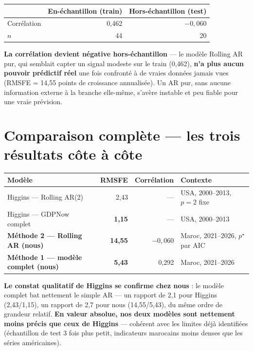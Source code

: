 \documentclass[11pt,a4paper]{article}
\begin{document}
\begin{resultatbox}
\begin{center}
\begin{tabular}{lrr}
\toprule
& \textbf{En-échantillon (train)} & \textbf{Hors-échantillon (test)} \\
\midrule
Corrélation & 0,462 & $-0{,}060$ \\
$n$ & 44 & 20 \\
\bottomrule
\end{tabular}
\end{center}
\end{resultatbox}

\begin{alertebox}
\textbf{La corrélation devient négative hors-échantillon} --- le modèle Rolling AR pur, qui semblait capter un signal modeste sur le train (0,462), \textbf{n'a plus aucun pouvoir prédictif réel} une fois confronté à de vraies données jamais vues (RMSFE = 14,55 points de croissance annualisée). Un AR pur, sans aucune information externe à la branche elle-même, s'avère instable et peu fiable pour une vraie prévision.
\end{alertebox}

\section{Comparaison complète --- les trois résultats côte à côte}

\begin{center}
\small
\begin{tabular}{lrrl}
\toprule
\textbf{Modèle} & \textbf{RMSFE} & \textbf{Corrélation} & \textbf{Contexte} \\
\midrule
Higgins --- Rolling AR(2) & 2,43 & --- & USA, 2000--2013, $p=2$ fixe \\
Higgins --- GDPNow complet & \textbf{1,15} & --- & USA, 2000--2013 \\
\midrule
\textbf{Méthode 2 --- Rolling AR (nous)} & \textbf{14,55} & $-0{,}060$ & Maroc, 2021--2026, $p^\star$ par AIC \\
\textbf{Méthode 1 --- modèle complet (nous)} & \textbf{5,43} & 0,292 & Maroc, 2021--2026 \\
\bottomrule
\end{tabular}
\end{center}

\begin{resultatbox}
\textbf{Le constat qualitatif de Higgins se confirme chez nous} : le modèle complet bat nettement le simple AR --- un rapport de 2,1 pour Higgins (2,43/1,15), un rapport de 2,7 pour nous (14,55/5,43), du même ordre de grandeur relatif. \textbf{En valeur absolue, nos deux modèles sont nettement moins précis que ceux de Higgins} --- cohérent avec les limites déjà identifiées (échantillon de test 3 fois plus petit, indicateurs marocains moins denses que les séries américaines).
\end{resultatbox}
\end{document}
